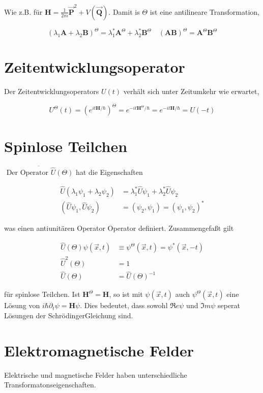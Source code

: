 \documentclass[10pt, letterpaper]{article}
\begin{document}
Wie z.B. für $\mathbf{H}=\frac{1}{2 m} \overrightarrow{\mathbf{P}}^{2}+V(\overrightarrow{\mathbf{Q}})$. Damit is $\Theta$ ist eine antilineare Transformation,

$$
\left(\lambda_{1} \mathbf{A}+\lambda_{2} \mathbf{B}\right)^{\Theta}=\lambda_{1}^{*} \mathbf{A}^{\Theta}+\lambda_{2}^{*} \mathbf{B}^{\Theta} \quad(\mathbf{A B})^{\Theta}=\mathbf{A}^{\Theta} \mathbf{B}^{\Theta}
$$

\section*{Zeitentwicklungsoperator}
Der Zeitentwicklungsoperators $U(t)$ verhält sich unter Zeitumkehr wie erwartet,

$$
U^{\Theta}(t)=\left(e^{i t \mathbf{H} / \hbar}\right)^{\Theta}=e^{-i t \mathbf{H}^{\Theta} / \hbar}=e^{-i t \mathbf{H} / \hbar}=U(-t)
$$

\section*{Spinlose Teilchen}
$\overline{\text { Der Operator } \hat{U}(\Theta)}$ hat die Eigenschaften

$$
\begin{aligned}
\widehat{U}\left(\lambda_{1} \psi_{1}+\lambda_{2} \psi_{2}\right) & =\lambda_{1}^{*} \widehat{U} \psi_{1}+\lambda_{2}^{*} \widehat{U} \psi_{2} \\
\left(\widehat{U} \psi_{1}, \widehat{U} \psi_{2}\right) & =\left(\psi_{2}, \psi_{1}\right)=\left(\psi_{1}, \psi_{2}\right)^{*}
\end{aligned}
$$

was einen antiunitären Operator Operator definiert. Zusammengefaßt gilt

$$
\begin{aligned}
\widehat{U}(\Theta) \psi(\vec{x}, t) & \equiv \psi^{\Theta}(\vec{x}, t)=\psi^{*}(\vec{x},-t) \\
\widehat{U}^{2}(\Theta) & =1 \\
\widehat{U}(\Theta) & =\widehat{U}(\Theta)^{-1}
\end{aligned}
$$

für spinlose Teilchen. Ist $\mathbf{H}^{\Theta}=\mathbf{H}$, so ist mit $\psi(\vec{x}, t)$ auch $\psi^{\Theta}(\vec{x}, t)$ eine Lösung von $i \hbar \partial_{t} \psi=\mathbf{H} \psi$. Dies bedeutet, dass sowohl $\Re e \psi$ und $\Im m \psi$ seperat Lösungen der SchrödingerGleichung sind.

\section*{Elektromagnetische Felder}
Elektrische und magnetische Felder haben unterschiedliche Transformatonseigenschaften.
\end{document}

